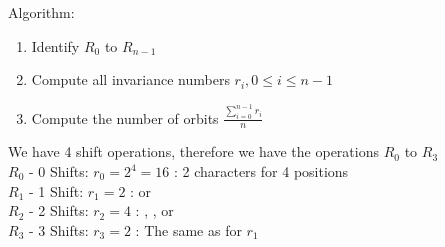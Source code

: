 \documentclass[12pt,onecolumn%
]{scrartcl}
\newcommand{\st}[4]{
\boxed{\text{#1}}\boxed{\text{#2}}\boxed{\text{#3}}\boxed{\text{#4}}
}
\begin{document}
{Algorithm:
\begin{center}
\begin{enumerate}
\item Identify $R_{0}$ to $R_{n-1}$ \\
\item Compute all invariance numbers $ r_{i},0 \leq i \leq n - 1$ \\
\item Compute the number of orbits $\frac{\sum \limits_{i = 0}^{n - 1} r_{i}}{n}$
\end{enumerate}
\end{center}

We have 4 shift operations, therefore we have the operations $R_{0}$ to $R_{3}$ \\
$R_0$ - 0 Shifts: $r_{0} = 2^{4} = 16$ : 2 characters for 4 positions \\
$R_1$ - 1 Shift: $r_{1} = 2$ : \st{A}{A}{A}{A} or \st{B}{B}{B}{B} \\
$R_2$ - 2 Shifts: $r_{2} = 4$ : \st{A}{A}{A}{A} , \st{B}{B}{B}{B}, \st{A}{B}{A}{B} or \st{B}{A}{B}{A} \\
$R_3$ - 3 Shifts: $r_{3} = 2$ : The same as for $r_{1}$

}
\end{document}
